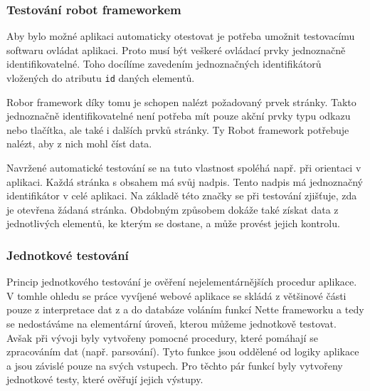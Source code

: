 \documentclass[czech,BP]{thesiskiv}
\begin{document}
		\subsubsection{Testování robot frameworkem}
		\par Aby bylo možné aplikaci automaticky otestovat je potřeba umožnit testovacímu softwaru ovládat aplikaci. Proto musí být veškeré ovládací prvky jednoznačně identifikovatelné. Toho docílíme zavedením jednoznačných identifikátorů vložených do atributu \texttt{id} daných elementů.
		\par Robor framework díky tomu je schopen nalézt požadovaný prvek stránky. Takto jednoznačně identifikovatelné není potřeba mít pouze akční prvky typu odkazu nebo tlačítka, ale také i dalších prvků stránky. Ty Robot framework potřebuje nalézt, aby z nich mohl číst data.
		\par Navržené automatické testování se na tuto vlastnost spoléhá např. při orientaci v aplikaci. Každá stránka s obsahem má svůj nadpis. Tento nadpis má jednoznačný identifikátor v celé aplikaci. Na základě této značky se při testování zjišťuje, zda je otevřena žádaná stránka. Obdobným způsobem dokáže také získat data z jednotlivých elementů, ke kterým se dostane, a může provést jejich kontrolu.
		
		\subsubsection{Jednotkové testování}
		\par Princip jednotkového testování je ověření nejelementárnějších procedur aplikace. V tomhle ohledu se práce vyvíjené webové aplikace se skládá z většinové části pouze z interpretace dat z a do databáze voláním funkcí Nette frameworku a tedy se nedostáváme na elementární úroveň, kterou můžeme jednotkově testovat. Avšak při vývoji byly vytvořeny pomocné procedury, které pomáhají se zpracováním dat (např. parsování). Tyto funkce jsou oddělené od logiky aplikace a jsou závislé pouze na svých vstupech. Pro těchto pár funkcí byly vytvořeny jednotkové testy, které ověřují jejich výstupy.
		
\end{document}

